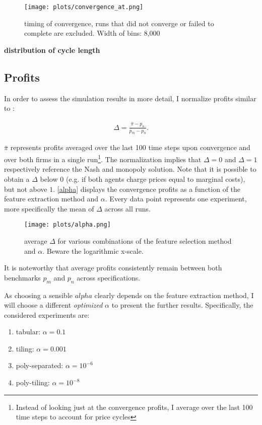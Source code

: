 \begin{figure}
	\texttt{[image: plots/convergence\_at.png]}
	\caption{timing of convergence, runs that did not converge or failed to complete are excluded. Width of bins: 8,000}
	\label{convergence_at}
\end{figure}

\textbf{distribution of cycle length}

\subsection{Profits}

In order to assess the simulation results in more detail, I normalize profits similar to \textcite{calvano_algorithmic_2018}:

\begin{gather}
\Delta = \frac{\bar{\pi} - p_n}{p_m - p_n}.
\end{gather}

$\bar{\pi}$ represents profits averaged over the last 100 time steps upon convergence and over both firms in a single run\footnote{Instead of looking just at the convergence profits, I average over the last 100 time steps to account for price cycles}. The normalization implies that $\Delta = 0$ and $\Delta = 1$ respectively reference the Nash and monopoly solution. Note that it is possible to obtain a $\Delta$ below $0$ (e.g. if both agents charge prices equal to marginal costs), but not above $1$. \autoref{alpha} displays the convergence profits as a function of the feature extraction method and $\alpha$. Every data point represents one experiment, more specifically the mean of $\Delta$ across all runs.

\begin{figure}
	\texttt{[image: plots/alpha.png]}
	\caption{average $\Delta$ for various combinations of the feature selection method and $\alpha$. Beware the logarithmic x-scale.}
	\label{alpha}
\end{figure}

It is noteworthy that average profits consistently remain between both benchmarks $p_m$ and $p_n$ across specifications.


As choosing a sensible $alpha$ clearly depends on the feature extraction method, I will choose a different \emph{optimized} $\alpha$ to present the further results. Specifically, the considered experiments are:

\begin{enumerate}
	\item tabular: $\alpha = 0.1$
	\item tiling: $\alpha = 0.001$
	\item poly-separated: $\alpha = 10^{-6}$
	\item poly-tiling: $\alpha = 10^{-8}$
\end{enumerate}

